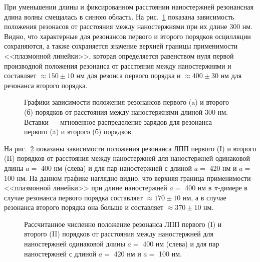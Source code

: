 При уменьшении длины и фиксированном расстоянии наностержней резонансная длина волны смещалась в синюю область. На рис.~\ref{img:a300PML} показана зависимость положения резонасов от расстояния между наностержнями при их длине 300 нм. Видно, что характерные для резонансов первого и второго порядков осцилляции сохраняются, а также сохраняется значение верхней границы применимости <<плазмонной линейки>>, которая определяется равенством нуля первой производной положения резонанса от расстояния между наностержнями и составляет  $ \approx 150 \pm 10 $ нм для резонса первого порядка и $ \approx 400 \pm 30 $ нм для резонанса второго порядка.

\begin{figure}
\caption{Графики зависимости положения  резонансов первого (a) и второго (б) порядков от расстояния между наностержнями длиной 300 нм. Вставки --- мгновенное распределение зарядов для резонанса первого (a) и второго (б) порядков.}
\label{img:a300PML}
\end{figure}

На рис.~\ref{img:res_comparison} показаны зависимости положения резонанса ЛПП первого (I) и второго (II) порядков от расстояния между наностержней для наностержней одинаковой длины $ a = $ 400 нм (слева) и для пар наностержней с длиной $ a = $ 420 нм и $ a = $ 100 нм. На данном графике наглядно видно, что верхняя граница применимости <<плазмонной линейки>> при длине наностержней $ a = $ 400 нм в $ \pi $-димере в случае резонанса первого порядка составляет $ \approx 170 \pm 10 $ нм, а в случае резонанса второго порядка она больше и составляет $ \approx 370 \pm 10 $ нм.
\begin{figure}
\caption{Рассчитанное численно положение резонанса ЛПП первого (I) и второго (II) порядков от расстояния между наностержней для наностержней одинаковой длины $ a = $ 400 нм (слева) и для пар наностержней с длиной $ a = $ 420 нм и $ a = $ 100 нм.}
\label{img:res_comparison}
\end{figure}


